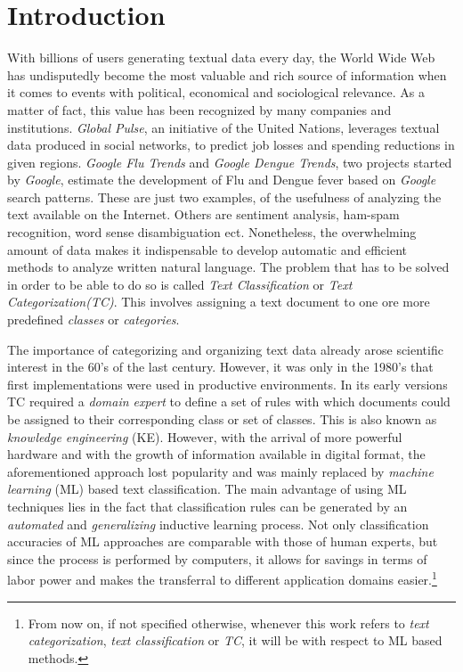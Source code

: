 
\chapter{Introduction}
\label{ch:Introduction}

With billions of users generating textual data every day, the World
Wide Web has undisputedly become the most valuable and rich source
of information when it comes to events with political, economical and
sociological relevance. As a matter of fact, this value has been recognized by
many companies and institutions. \emph{Global Pulse}, an initiative of the United
Nations, leverages textual data produced in social networks, to predict job
losses and spending reductions in given regions. \emph{Google Flu
Trends} and \emph{Google Dengue Trends}, two projects started by \emph{Google},
estimate the development of Flu and Dengue fever based on \emph{Google} search
patterns. These are just two examples, of the usefulness of analyzing the
text available on the Internet. Others are sentiment analysis, ham-spam
recognition, word sense disambiguation ect.
Nonetheless, the overwhelming amount of data makes it indispensable to develop
automatic and efficient methods to analyze written natural language. 
The problem that has to be solved in order to be able to do so is called \emph{Text Classification} or \emph{Text Categorization(TC)}.
This involves assigning a text document to one ore more predefined \emph{classes} or
\emph{categories}.

The importance of categorizing and organizing text data already
arose scientific interest in the 60's of the last century. However, it was only
in the 1980's that first implementations were used in productive environments. 
In its early versions TC required a \textit{domain expert} to define a set of
rules with which documents could be assigned to their corresponding class or set
of classes. This is also known as \textit{knowledge engineering} (KE).
However, with the arrival of more powerful hardware and with the growth of
information available in digital format, the aforementioned approach lost
popularity and was mainly replaced by \textit{machine learning} (ML)
based text classification.
The main advantage of using ML techniques lies in the fact that classification
rules can be generated by an \textit{automated} and \emph{generalizing} inductive learning process. 
Not only classification accuracies of ML approaches are comparable with those of
human experts, but since the process is performed by computers, it allows for savings
in terms of labor power and makes the transferral to different application
domains easier.\footnote{From now on, if not specified otherwise, whenever this work
refers to \textit{text categorization}, \textit{text classification} or \textit{TC}, it
will be with respect to ML based methods.}

